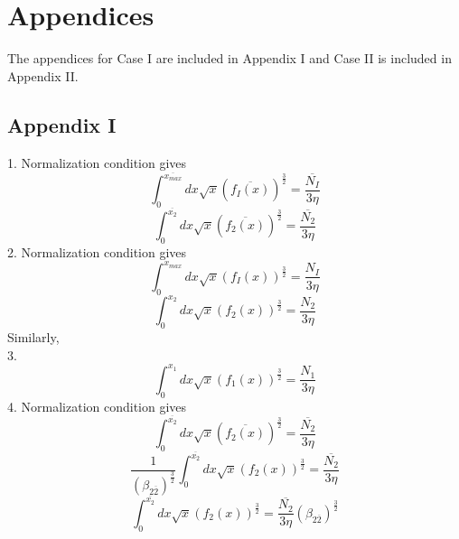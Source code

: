 \documentclass[fleqn, 10pt]{article}
\begin{document}
    \section{Appendices}
            The appendices for Case I are included in Appendix I and Case II is included in Appendix II. 
            \subsection{Appendix I}
1.    Normalization condition gives
    \begin{equation*}
      \int^{\overline{x_{max}}}_0 dx \sqrt{x} (\overline{f_I(x)})^\frac{3}{2} = \frac{\overline{N_I}}{3\eta} 
      \label{33}
    \end{equation*}
    \begin{equation}
        \int^{\overline{x_2}}_0 dx \sqrt{x} (\overline{f_2(x)})^\frac{3}{2} = \frac{\overline{N_2}}{3\eta}
    \end{equation}
2.    Normalization condition gives
    \begin{equation*}
      \int^{x_{max}}_0 dx \sqrt{x} (f_I(x))^\frac{3}{2} = \frac{N_I}{3\eta} 
      \label{33}
    \end{equation*}
    \begin{equation}
        \int^{x_2}_0 dx \sqrt{x} (f_2(x))^\frac{3}{2} = \frac{N_2}{3\eta}
    \end{equation}
   Similarly, \\
 3.   \begin{equation}
        \int^{x_1}_0 dx \sqrt{x} (f_1(x))^\frac{3}{2} = \frac{N_1}{3\eta}
    \end{equation}
  4. Normalization condition gives 
                \begin{equation*}
                \int^{\overline{x_2}}_0 dx \sqrt{x} (\overline{f_2(x)})^\frac{3}{2} = \frac{\overline{N_2}}{3 \eta}    
                \end{equation*}
                \begin{equation*}
                    \frac{1}{(\beta_{2\overline{2}})^\frac{3}{2}}\int^{\overline{x_2}}_0 dx \sqrt{x} (f_2(x))^\frac{3}{2} = \frac{\overline{N_2}}{3 \eta}
                \end{equation*}
                \begin{equation}
                   \int^{\overline{x_2}}_0 dx \sqrt{x} (f_2(x))^\frac{3}{2} = \frac{\overline{N_2}}{3 \eta} (\beta_{2\overline{2}})^\frac{3}{2}
                   \label{79}
                \end{equation}
\end{document}

